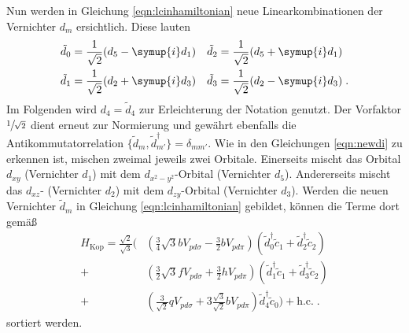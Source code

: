 Nun werden in Gleichung \eqref{eqn:lcinhamiltonian} neue Linearkombinationen der Vernichter $d_m$ ersichtlich.
Diese lauten 
\begin{equation}
    \begin{aligned}
    \tilde{d}_0 &= \frac{1}{\sqrt{2}} (d_5-\symup{i}d_1) & \tilde{d}_2 &= \frac{1}{\sqrt{2}} (d_5+\symup{i}d_1) \\
    \tilde{d}_1 &= \frac{1}{\sqrt{2}} (d_2+\symup{i}d_3) & \tilde{d}_3 &= \frac{1}{\sqrt{2}} (d_2-\symup{i}d_3) \; . \label{eqn:newdi}
    \end{aligned}
\end{equation}
Im Folgenden wird $d_4 = \tilde{d}_4$ zur Erleichterung der Notation genutzt.
Der Vorfaktor $\sfrac{1}{\sqrt{2}}$ dient erneut zur Normierung und gewährt ebenfalls die Antikommutatorrelation $\{ \tilde{d}_m, \tilde{d}^\dagger_{m'} \} = \delta_{mm'}$.
Wie in den Gleichungen \eqref{eqn:newdi} zu erkennen ist, mischen zweimal jeweils zwei Orbitale.
Einerseits mischt das Orbital $d_{xy}$ (Vernichter $d_1$) mit dem $d_{x^2-y^2}$-Orbital (Vernichter $d_5$).
Andererseits mischt das $d_{xz}$- (Vernichter $d_2$) mit dem $d_{zy}$-Orbital (Vernichter $d_3$).
Werden die neuen Vernichter $\tilde{d}_m$ in Gleichung \eqref{eqn:lcinhamiltonian} gebildet, können die Terme dort gemäß
\begin{equation}
            \begin{split}
                H_\text{Kop} = \frac{\sqrt{2}}{\sqrt{3}}  \biggl(
                & \left ( \frac{3}{4}\sqrt{3} b V_{pd\sigma} - \frac{3}{2}  b   V_{pd\pi} \right )      \left ( \tilde{d}^\dagger_0 \tilde{c}_1 + \tilde{d}^\dagger_2 \tilde{c}_2 \right )   \\
            +    & \left ( \frac{3}{2}\sqrt{3} f V_{pd\sigma} + \frac{3}{2}  h   V_{pd\pi} \right )     \left ( \tilde{d}^\dagger_1 \tilde{c}_1 + \tilde{d}^\dagger_3 \tilde{c}_2 \right )   \\
            +    & \left ( \frac{3}{\sqrt{2}} q V_{pd\sigma} + 3 \frac{\sqrt{3}}{\sqrt{2}}  b V_{pd\pi} \right ) \tilde{d}^\dagger_4 \tilde{c}_0 \biggr) + \text{h.c.} \; .
            \end{split}
            \label{eqn:Hkopnice}
\end{equation}
sortiert werden.\\
